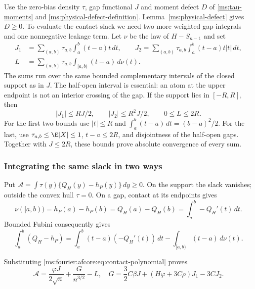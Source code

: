 Use the zero-bias density $\tau$, gap functional $J$ and moment defect
$D$ of \eqref{ms:tau-moments} and
\eqref{ms:physical-defect-definition}. Lemma~\ref{ms:physical-defect}
gives $D\ge0$. To evaluate the contact slack we need two more weighted
gap integrals and one nonnegative leakage term. Let $\nu$ be the law of
$H-S_{n-1}$ and set
\begin{align}
 J_1&=\sum_{(a,b)}\tau_{a,b}\int_a^b(t-a)t\,dt,\qquad
 J_2=\sum_{(a,b)}\tau_{a,b}\int_a^b(t-a)t|t|\,dt,\nonumber\\
 L&=\sum_{(a,b)}\tau_{a,b}\int_{[a,b)}(t-a)\,d\nu(t).
 \label{ms:fourier:afcore:eq:gap-definitions}
\end{align}
The sums run over the same bounded complementary intervals of the closed
support as in $J$. The half-open interval is essential: an atom at the
upper endpoint is not an interior crossing of the gap.
If the support lies in $[-R,R]$, then
\[
 |J_1|\le RJ/2,\qquad |J_2|\le R^2J/2,
 \qquad 0\le L\le2R.
\]
For the first two bounds use $|t|\le R$ and
$\int_a^b(t-a)\,dt=(b-a)^2/2$. For the last, use
$\tau_{a,b}\le\E|X|\le1$, $t-a\le2R$, and disjointness of the
half-open gaps. Together with $J\le2R$, these bounds prove absolute
convergence of every sum.

\subsubsection{Integrating the same slack in two ways}

Put $\mathcal A=\int\tau(y)\{Q_H(y)-h_P(y)\}\,dy\ge0$.
On the support the slack vanishes; outside the convex hull $\tau=0$.
On a gap, contact at its endpoints gives
\[
 \nu([a,b))=h_P(a)-h_P(b)=Q_H(a)-Q_H(b)
                         =\int_a^b -Q_H'(t)\,dt.
\]
Bounded Fubini consequently gives
\[
 \int_a^b(Q_H-h_P)
 =\int_a^b(t-a)(-Q_H'(t))\,dt
       -\int_{[a,b)}(t-a)\,d\nu(t).
\]

Substituting \eqref{ms:fourier:afcore:eq:contact-polynomial} proves
\begin{equation}\label{ms:fourier:afcore:eq:first-slack}
 \mathcal A=\frac{\varphi J}{2\sqrt n}+\frac{G}{n^{3/2}}-L,
 \quad
 G=\frac32C\beta J+(H\varphi+3C\rho)J_1-3CJ_2.
\end{equation}

